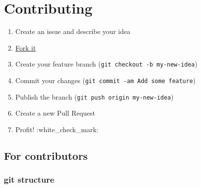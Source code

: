 \section{Contributing}\label{contributing}

\begin{enumerate}
\def\labelenumi{\arabic{enumi}.}

\item
  Create an issue and describe your idea
\item
  \href{https://github.com/demanasta/coulomb2gmt/network\#fork-destination-box}{Fork
  it}
\item
  Create your feature branch (\texttt{git\ checkout\ -b\ my-new-idea})
\item
  Commit your changes
  (\texttt{git\ commit\ -am\  Add\ some\ feature})
\item
  Publish the branch (\texttt{git\ push\ origin\ my-new-idea})
\item
  Create a new Pull Request
\item
  Profit! :white\_check\_mark:
\end{enumerate}

\subsection{For contributors}\label{for-contributors}

\subsubsection{git structure}\label{git-structure}

